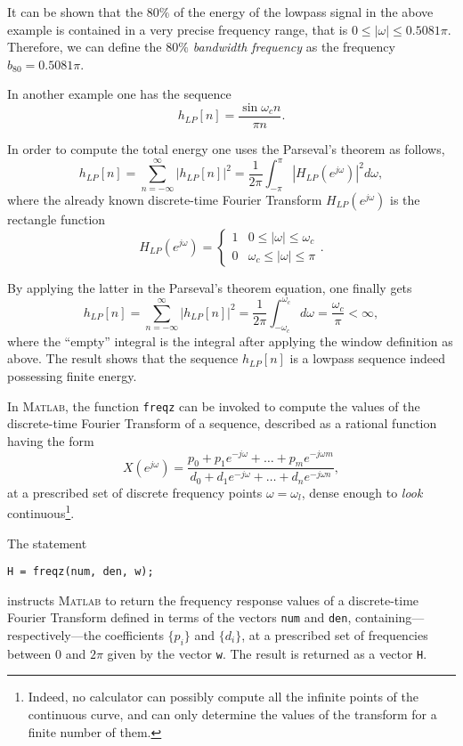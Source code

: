\documentclass[\documentfontsize, twocolumn]{\classname}
\begin{document}
It can be shown that the $80\%$ of the energy of the lowpass signal in the above example is contained in a very precise frequency range, that is $0 \leq |\omega| \leq 0.5081\pi$. Therefore, we can define the \emph{$80\%$ bandwidth frequency} as the frequency $b_{80} = 0.5081\pi$.

In another example one has the sequence
\[
    h_{LP}[n] = \frac {\sin {\omega_c n}}{\pi n}.
\]

In order to compute the total energy one uses the Parseval's theorem as follows,
\[
h_{LP}[n] = \sum_{n=-\infty}^\infty \left|h_{LP}[n]\right|^2 = \frac 1 {2\pi} \int_{-\pi}^\pi \left|H_{LP}(e^{j\omega})\right|^2d\omega,
\]
where the already known discrete-time Fourier Transform $H_{LP}(e^{j\omega})$ is the rectangle function
\[
    H_{LP}(e^{j\omega}) = \left\{\begin{array}{ll}
        1 & 0 \leq |\omega| \leq \omega_c\\
        0 & \omega_c \leq |\omega| \leq \pi
        \end{array}\right..
\]

By applying the latter in the Parseval's theorem equation, one finally gets
\[
h_{LP}[n] = \sum_{n=-\infty}^\infty \left|h_{LP}[n]\right|^2 = \frac 1 {2\pi} \int_{-\omega_c}^{\omega_c} d\omega = \frac {\omega_c} \pi < \infty,
\]
where the ``empty'' integral is the integral after applying the window definition as above. The result shows that the sequence $h_{LP}[n]$ is a lowpass sequence indeed possessing finite energy.

In \textsc{Matlab}, the function \texttt{freqz} can be invoked to compute the values of the discrete-time Fourier Transform of a sequence, described as a rational function having the form
\begin{equation}\label{eqn:dtftRationalForm}
    X(e^{j\omega}) = \frac
    {p_0 + p_1e^{-j\omega} + \dots + p_m e^{-j\omega m}}
    {d_0 + d_1e^{-j\omega} + \dots + d_n e^{-j\omega n}},
\end{equation}
at a prescribed set of discrete frequency points $\omega = \omega_l$, dense enough to \emph{look} continuous\footnote{Indeed, no calculator can possibly compute all the infinite points of the continuous curve, and can only determine the values of the transform for a finite number of them.}.

The statement
\begin{verbatim}
H = freqz(num, den, w);
\end{verbatim}
instructs \textsc{Matlab} to return the frequency response values of a discrete-time Fourier Transform defined in terms of the vectors \texttt{num} and \texttt{den}, con\-tain\-ing---res\-pec\-ti\-ve\-ly---the coefficients $\{p_i\}$ and $\{d_i\}$, at a prescribed set of frequencies between $0$ and $2\pi$ given by the vector \texttt{w}. The result is returned as a vector \texttt{H}.
\end{document}
